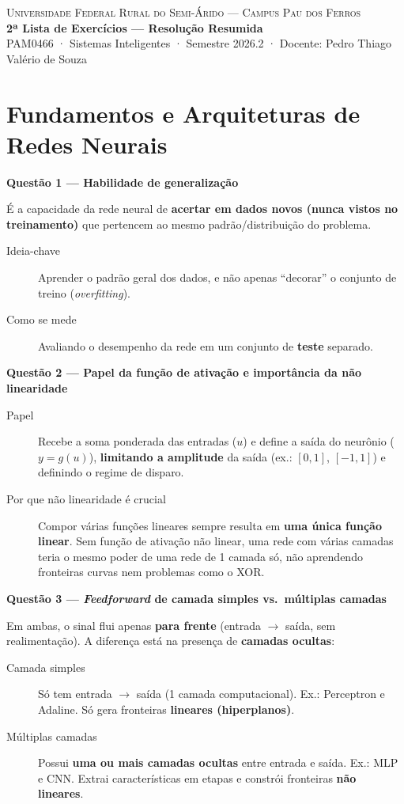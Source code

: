 \documentclass[10pt,a4paper]{article}
\newcommand{\questao}[2]{%
  \needspace{4\baselineskip}%
  \vspace{0.45em}\noindent
  {\color{azulufersa}\bfseries Questão #1 --- #2}\par\nopagebreak\vspace{0.15em}\noindent\ignorespaces%
}
\begin{document}
\begin{center}
  {\small\textsc{Universidade Federal Rural do Semi-Árido --- Campus Pau dos Ferros}}\\[2pt]
  {\Large\bfseries\color{azulufersa} 2ª Lista de Exercícios --- Resolução Resumida}\\[3pt]
  {\small\color{cinzatexto} PAM0466 · Sistemas Inteligentes · Semestre 2026.2 · Docente: Pedro Thiago Valério de Souza}
\end{center}
\vspace{0.2em}

\section{Fundamentos e Arquiteturas de Redes Neurais}

\questao{1}{Habilidade de generalização}
É a capacidade da rede neural de \textbf{acertar em dados novos (nunca vistos no treinamento)} que pertencem ao mesmo padrão/distribuição do problema.
\begin{description}
  \item[Ideia-chave] Aprender o padrão geral dos dados, e não apenas \enquote{decorar} o conjunto de treino (\emph{overfitting}).
  \item[Como se mede] Avaliando o desempenho da rede em um conjunto de \textbf{teste} separado.
\end{description}

\questao{2}{Papel da função de ativação e importância da não linearidade}
\begin{description}
  \item[Papel] Recebe a soma ponderada das entradas ($u$) e define a saída do neurônio ($y = g(u)$), \textbf{limitando a amplitude} da saída (ex.: $[0,1]$, $[-1,1]$) e definindo o regime de disparo.
  \item[Por que não linearidade é crucial] Compor várias funções lineares sempre resulta em \textbf{uma única função linear}. Sem função de ativação não linear, uma rede com várias camadas teria o mesmo poder de uma rede de 1 camada só, não aprendendo fronteiras curvas nem problemas como o XOR.
\end{description}

\questao{3}{\emph{Feedforward} de camada simples vs.\ múltiplas camadas}
Em ambas, o sinal flui apenas \textbf{para frente} (entrada $\to$ saída, sem realimentação). A diferença está na presença de \textbf{camadas ocultas}:
\begin{description}
  \item[Camada simples] Só tem entrada $\to$ saída (1 camada computacional). Ex.: Perceptron e Adaline. Só gera fronteiras \textbf{lineares (hiperplanos)}.
  \item[Múltiplas camadas] Possui \textbf{uma ou mais camadas ocultas} entre entrada e saída. Ex.: MLP e CNN. Extrai características em etapas e constrói fronteiras \textbf{não lineares}.
\end{description}
\end{document}
